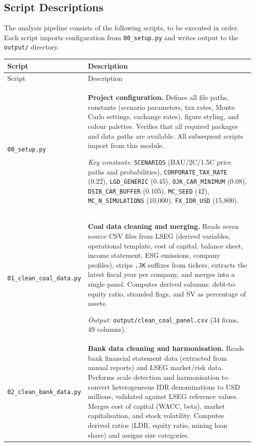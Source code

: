\subsection{Script Descriptions}
\label{subsec:scripts}

The analysis pipeline consists of the following scripts, to be executed in order. Each script imports configuration from \texttt{00\_setup.py} and writes output to the \texttt{output/} directory.

\begin{longtable}{p{4cm}p{9.5cm}}
\toprule
Script & Description \\
\midrule
\endfirsthead
\toprule
Script & Description \\
\midrule
\endhead
\bottomrule
\endfoot

\texttt{00\_setup.py} &
\textbf{Project configuration.} Defines all file paths, constants (scenario parameters, tax rates, Monte Carlo settings, exchange rates), figure styling, and colour palettes. Verifies that all required packages and data paths are available. All subsequent scripts import from this module.

\textit{Key constants:} \texttt{SCENARIOS} (BAU/2C/1.5C price paths and probabilities), \texttt{CORPORATE\_TAX\_RATE} (0.22), \texttt{LGD\_GENERIC} (0.45), \texttt{OJK\_CAR\_MINIMUM} (0.08), \texttt{DSIB\_CAR\_BUFFER} (0.105), \texttt{MC\_SEED} (42), \texttt{MC\_N\_SIMULATIONS} (10,000), \texttt{FX\_IDR\_USD} (15,800). \\[8pt]

\texttt{01\_clean\_coal\_data.py} &
\textbf{Coal data cleaning and merging.} Reads seven source CSV files from LSEG (derived variables, operational template, cost of capital, balance sheet, income statement, ESG emissions, company profiles), strips \texttt{.JK} suffixes from tickers, extracts the latest fiscal year per company, and merges into a single panel. Computes derived columns: debt-to-equity ratio, stranded flags, and SV as percentage of assets.

\textit{Output:} \texttt{output/clean\_coal\_panel.csv} (34 firms, 49 columns). \\[8pt]

\texttt{02\_clean\_bank\_data.py} &
\textbf{Bank data cleaning and harmonisation.} Reads bank financial statement data (extracted from annual reports) and LSEG market/risk data. Performs scale detection and harmonisation to convert heterogeneous IDR denominations to USD millions, validated against LSEG reference values. Merges cost of capital (WACC, beta), market capitalisation, and stock volatility. Computes derived ratios (LDR, equity ratio, mining loan share) and assigns size categories.


\end{longtable}
